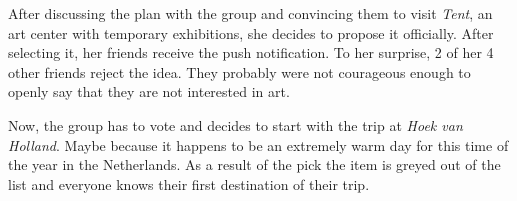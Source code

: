 \documentclass[11pt,a4paper,oneside]{article}
\begin{document}
After discussing the plan with the group and convincing them to visit \emph{Tent}, an art center with temporary exhibitions, she decides to propose it officially. After selecting it, her friends receive the push notification. To her surprise, 2 of her 4 other friends reject the idea. They probably were not courageous enough to openly say that they are not interested in art.  

Now, the group has to vote and decides to start with the trip at \emph{Hoek van Holland}. Maybe because it happens to be an extremely warm day for this time of the year in the Netherlands. As a result of the pick the item is greyed out of the list and everyone knows their first destination of their trip.
\end{document}
